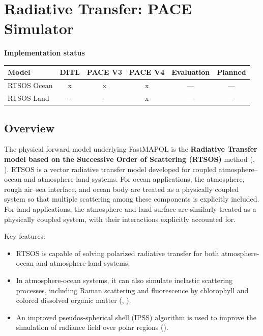 \documentclass[
  11pt,
  letterpaper,
]{scrreprt}
\providecommand{\tightlist}{%
  \setlength{\itemsep}{0pt}\setlength{\parskip}{0pt}}
\begin{document}
\chapter{Radiative Transfer: PACE Simulator}\label{sec-rt-model}

\textbf{Implementation status}

\begin{longtable}[]{@{}lccccc@{}}
\toprule\noalign{}
Model & DITL & PACE V3 & PACE V4 & Evaluation & Planned \\
\midrule\noalign{}
\endhead
\bottomrule\noalign{}
\endlastfoot
RTSOS Ocean & x & x & x & --- & --- \\
RTSOS Land & - & - & x & --- & --- \\
\end{longtable}

\section{Overview}\label{overview-2}

The physical forward model underlying FastMAPOL is the \textbf{Radiative
Transfer model based on the Successive Order of Scattering (RTSOS)}
method (,
). RTSOS is a vector radiative transfer
model developed for coupled atmosphere--ocean and atmosphere-land
systems. For ocean applications, the atmosphere, rough air--sea
interface, and ocean body are treated as a physically coupled system so
that multiple scattering among these components is explicitly included.
For land applications, the atmosphere and land surface are similarly
treated as a physically coupled system, with their interactions
explicitly accounted for.

Key features:

\begin{itemize}
\tightlist
\item
  RTSOS is capable of solving polarized radiative transfer for both
  atmosphere-ocean and atmosphere-land systems.
\item
  In atmosphere-ocean systems, it can also simulate inelastic scattering
  processes, including Raman scattering and fluorescence by chlorophyll
  and colored dissolved organic matter (, ).
\item
  An improved pseudos-spherical shell (IPSS) algorithm is used to
  improve the simulation of radiance field over polar regions
  ().
\end{itemize}
\end{document}
